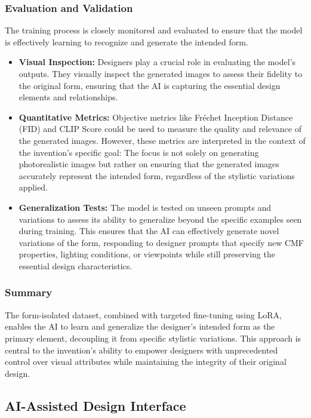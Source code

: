 \documentclass{article}
\begin{document}
\subsubsection{Evaluation and Validation}
The training process is closely monitored and evaluated to ensure that the model is effectively learning to recognize and generate the intended form.

\begin{itemize}
    \item \textbf{Visual Inspection:} Designers play a crucial role in evaluating the model's outputs. They visually inspect the generated images to assess their fidelity to the original form, ensuring that the AI is capturing the essential design elements and relationships.
    \item \textbf{Quantitative Metrics:} Objective metrics like Fréchet Inception Distance (FID) and CLIP Score could be used to measure the quality and relevance of the generated images. However, these metrics are interpreted in the context of the invention's specific goal: The focus is not solely on generating photorealistic images but rather on ensuring that the generated images accurately represent the intended form, regardless of the stylistic variations applied.
    \item \textbf{Generalization Tests:} The model is tested on unseen prompts and variations to assess its ability to generalize beyond the specific examples seen during training. This ensures that the AI can effectively generate novel variations of the form, responding to designer prompts that specify new CMF properties, lighting conditions, or viewpoints while still preserving the essential design characteristics.
\end{itemize}

\subsubsection{Summary}
The form-isolated dataset, combined with targeted fine-tuning using LoRA, enables the AI to learn and generalize the designer's intended form as the primary element, decoupling it from specific stylistic variations. This approach is central to the invention's ability to empower designers with unprecedented control over visual attributes while maintaining the integrity of their original design.

\subsection{AI-Assisted Design Interface}
\end{document}
